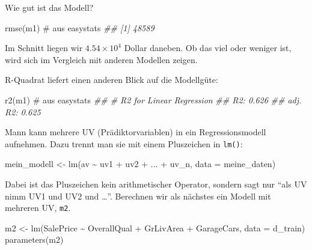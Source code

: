 \documentclass[
  letterpaper,
  oneside,
  open=any]{scrbook}
\newenvironment{Shaded}{\begin{snugshade}}{\end{snugshade}}
\newcommand{\AttributeTok}[1]{\textcolor[rgb]{0.40,0.45,0.13}{#1}}
\newcommand{\CommentTok}[1]{\textcolor[rgb]{0.37,0.37,0.37}{#1}}
\newcommand{\DocumentationTok}[1]{\textcolor[rgb]{0.37,0.37,0.37}{\textit{#1}}}
\newcommand{\FunctionTok}[1]{\textcolor[rgb]{0.28,0.35,0.67}{#1}}
\newcommand{\NormalTok}[1]{\textcolor[rgb]{0.00,0.23,0.31}{#1}}
\newcommand{\OtherTok}[1]{\textcolor[rgb]{0.00,0.23,0.31}{#1}}
\newcommand{\SpecialCharTok}[1]{\textcolor[rgb]{0.37,0.37,0.37}{#1}}
\theoremstyle{definition}
\theoremstyle{definition}
\theoremstyle{definition}
\theoremstyle{remark}
\begin{document}
Wie gut ist das Modell?

\begin{Shaded}
\begin{Highlighting}[]
\FunctionTok{rmse}\NormalTok{(m1)  }\CommentTok{\# aus easystats}
\DocumentationTok{\#\# [1] 48589}
\end{Highlighting}
\end{Shaded}

Im Schnitt liegen wir \ensuremath{4.54\times 10^{4}} Dollar daneben. Ob
das viel oder weniger ist, wird sich im Vergleich mit anderen Modellen
zeigen.

R-Quadrat liefert einen anderen Blick auf die Modellgüte:

\begin{Shaded}
\begin{Highlighting}[]
\FunctionTok{r2}\NormalTok{(m1)  }\CommentTok{\# aus easystats}
\DocumentationTok{\#\# \# R2 for Linear Regression}
\DocumentationTok{\#\#        R2: 0.626}
\DocumentationTok{\#\#   adj. R2: 0.625}
\end{Highlighting}
\end{Shaded}

Mann kann mehrere UV (Prädiktorvariablen) in ein Regressionsmodell
aufnehmen. Dazu trennt man sie mit einem Pluszeichen in \texttt{lm()}:

\begin{Shaded}
\begin{Highlighting}[]
\NormalTok{mein\_modell }\OtherTok{\textless{}{-}} \FunctionTok{lm}\NormalTok{(av }\SpecialCharTok{\textasciitilde{}}\NormalTok{ uv1 }\SpecialCharTok{+}\NormalTok{ uv2 }\SpecialCharTok{+}\NormalTok{ ... }\SpecialCharTok{+}\NormalTok{ uv\_n, }\AttributeTok{data =}\NormalTok{ meine\_daten)}
\end{Highlighting}
\end{Shaded}

Dabei ist das Pluszeichen kein arithmetischer Operator, sondern sagt nur
\enquote{als UV nimm UV1 und UV2 und \ldots{}}. Berechnen wir als
nächstes ein Modell mit mehreren UV, \texttt{m2}.

\begin{Shaded}
\begin{Highlighting}[]
\NormalTok{m2 }\OtherTok{\textless{}{-}} \FunctionTok{lm}\NormalTok{(SalePrice }\SpecialCharTok{\textasciitilde{}}\NormalTok{ OverallQual }\SpecialCharTok{+}\NormalTok{ GrLivArea }\SpecialCharTok{+}\NormalTok{ GarageCars, }\AttributeTok{data =}\NormalTok{ d\_train)}
\FunctionTok{parameters}\NormalTok{(m2)}
\end{Highlighting}
\end{Shaded}
\end{document}
